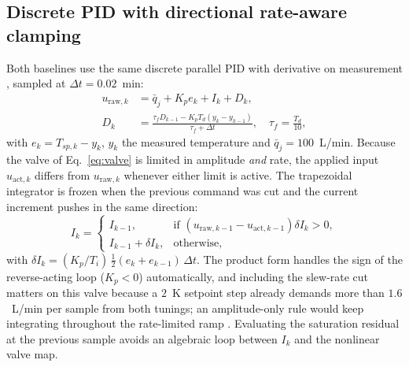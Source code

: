 
\subsection{Discrete PID with directional rate-aware clamping}
\label{subsec:pid}
Both baselines use the same discrete parallel PID with derivative on measurement \cite{astrom2006pid}, sampled at $\Delta t = 0.02$~min:
\begin{align}
    u_{\text{raw},k} &= \bar q_j + K_p e_k + I_k + D_k, \nonumber \\
    D_k &= \frac{\tau_f D_{k-1} - K_p T_d (y_k - y_{k-1})}{\tau_f + \Delta t}, \quad \tau_f = \frac{T_d}{10}, \label{eq:pid}
\end{align}
with $e_k = T_{sp,k} - y_k$, $y_k$ the measured temperature and $\bar q_j = 100$~L/min. Because the valve of Eq.~\eqref{eq:valve} is limited in amplitude \emph{and} rate, the applied input $u_{\text{act},k}$ differs from $u_{\text{raw},k}$ whenever either limit is active. The trapezoidal integrator is frozen when the previous command was cut and the current increment pushes in the same direction:
\begin{equation}
    I_k = \begin{cases}
        I_{k-1}, & \text{if } \left(u_{\text{raw},k-1} - u_{\text{act},k-1}\right)\delta I_k > 0, \\
        I_{k-1} + \delta I_k, & \text{otherwise,}
    \end{cases}
    \label{eq:clamping}
\end{equation}
with $\delta I_k = (K_p/T_i)\,\tfrac12(e_k + e_{k-1})\,\Delta t$. The product form handles the sign of the reverse-acting loop ($K_p < 0$) automatically, and including the slew-rate cut matters on this valve because a $2$~K setpoint step already demands more than $1.6$~L/min per sample from both tunings; an amplitude-only rule would keep integrating throughout the rate-limited ramp \cite{bohn1995analysis, peng1996nonlinear, hippe2006windup}. Evaluating the saturation residual at the previous sample avoids an algebraic loop between $I_k$ and the nonlinear valve map.

